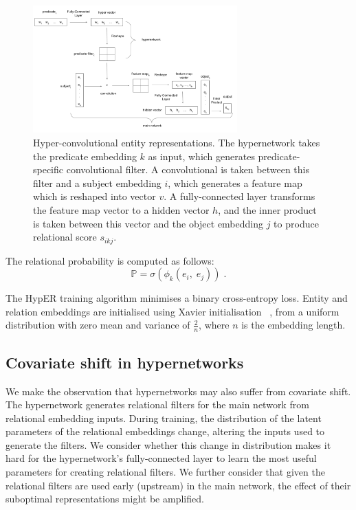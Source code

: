 \begin{figure}
   	\centering
    	\includegraphics[width=0.7\textwidth, height=0.5\textwidth]{hyper_neural_tensor_network_final}
	\captionsetup{justification=centering}
	\caption{Hyper-convolutional entity representations. The hypernetwork takes the predicate embedding $ k $ as input, which generates predicate-specific convolutional filter. A convolutional is taken between this filter and a subject embedding $ i $, which generates a feature map which is reshaped into vector $ v $. A fully-connected layer transforms the feature map vector to a hidden vector $ h $, and the inner product is taken between this vector and the object embedding $ j $ to produce relational score $ s_{ikj} $.}
\end{figure}

\noindent The relational probability is computed as follows: 
\begin{equation}
	\mathbb{P} = \sigma(\phi_k(e_i, \; e_j)) \; .
\end{equation}

\noindent The HypER training algorithm minimises a binary cross-entropy loss. Entity and relation embeddings are initialised using Xavier initialisation \unskip ~\citep{glorot2010understanding}, from a uniform distribution with zero mean and variance of $ \frac{2}{n} $, where $ n $ is the embedding length. \par

\subsection{Covariate shift in hypernetworks}

We make the observation that hypernetworks may also suffer from covariate shift. The hypernetwork generates relational filters for the main network from relational embedding inputs. During training, the distribution of the latent parameters of the relational embeddings change, altering the inputs used to generate the filters. We consider whether this change in distribution makes it hard for the hypernetwork's fully-connected layer to learn the most useful parameters for creating relational filters. We further consider that given the relational filters are used early (upstream) in the main network, the effect of their suboptimal representations might be amplified. \par

